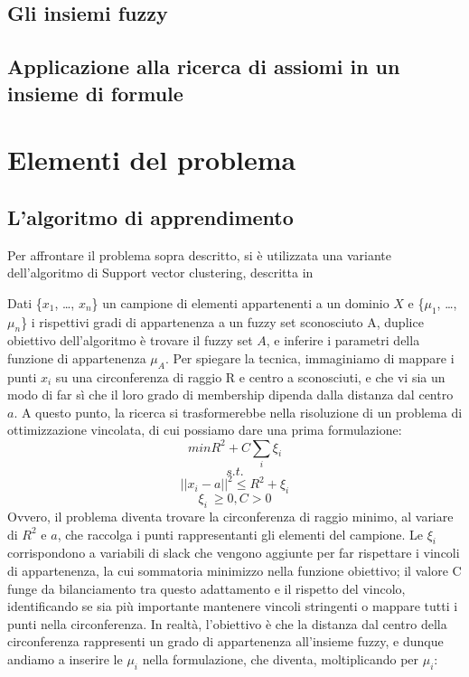 \documentclass[12pt,a4paper]{report}
\begin{document}
\section{Gli insiemi fuzzy}
\section{Applicazione alla ricerca di assiomi in un insieme di formule}

\chapter{Elementi del problema}
\section{L'algoritmo di apprendimento}
Per affrontare il problema sopra descritto, si è utilizzata una variante dell'algoritmo di Support vector clustering, descritta in \cite{svpaper}

Dati \{$x_1$, \dots , $x_n$\} un campione di elementi appartenenti a un dominio $X$ e  \{$\mu_1$, \dots , $\mu_n$\} i rispettivi gradi di appartenenza a un fuzzy set sconosciuto A, duplice obiettivo dell'algoritmo è trovare il fuzzy set $A$,  e inferire i parametri della funzione di appartenenza $\mu_A$. Per spiegare la tecnica, immaginiamo di mappare i punti  $x_i$ su una circonferenza di raggio R  e centro a sconosciuti, e che vi sia un modo di far sì che il  loro  grado di membership dipenda dalla distanza dal centro $a$.
A questo punto, la ricerca si trasformerebbe nella risoluzione di un problema di ottimizzazione vincolata, di cui possiamo dare una prima formulazione:
\[ min R^2 + C\sum_{i} \xi_{i}\]
\[s.t.\]
\[||x_i - a||^2  \leq R^2 + \xi_{i}\]
\[ \xi_{i}\ \geq 0, C > 0\]
Ovvero, il problema diventa trovare la circonferenza di raggio minimo, al variare di $R^2$ e $a$, che raccolga i punti rappresentanti gli elementi del campione.
Le $\xi_i$ corrispondono a variabili di slack che vengono aggiunte per far rispettare i vincoli di appartenenza, la cui sommatoria minimizzo nella funzione obiettivo; il valore C funge da bilanciamento tra questo adattamento e il rispetto del vincolo, identificando se sia più importante mantenere vincoli stringenti o mappare tutti i punti nella circonferenza.
In realtà, l'obiettivo è che la distanza dal centro della circonferenza rappresenti un grado di appartenenza all'insieme fuzzy, e dunque andiamo a inserire le $\mu_i$ nella formulazione, che diventa, moltiplicando per $\mu_i$:
\end{document}

